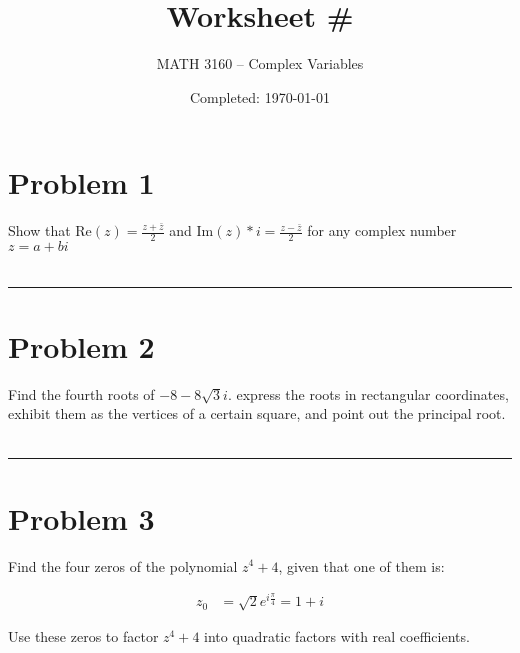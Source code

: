 \documentclass{article}
\title{Worksheet \#}
\author{
  MATH 3160 -- Complex Variables\\
  \myauthor
}
\date{Completed: \today}
\begin{document}
\maketitle %


\section*{Problem 1}
Show that Re$(z) = \frac{z+\bar z}{2}$ and Im$(z)*i = \frac{z-\bar z}{2}$ for any complex number $z = a+bi$

\begin{align*}
\end{align*}

\hrule %

\newpage
\section*{Problem 2}
Find the fourth roots of $-8-8\sqrt{3}i$. express the roots in rectangular coordinates, exhibit them as the vertices of a certain square, and point out the principal root.

\begin{align*}
\end{align*}

\hrule

\newpage
\section*{Problem 3}
Find the four zeros of the polynomial $z^4+4$, given that one of them is:

\begin{align*}
  z_0 &= \sqrt{2}e^{i\frac{\pi}{4}} = 1+i
\end{align*}

Use these zeros to factor $z^4+4$ into quadratic factors with real coefficients.
\vspace{1cm} %
\end{document}
